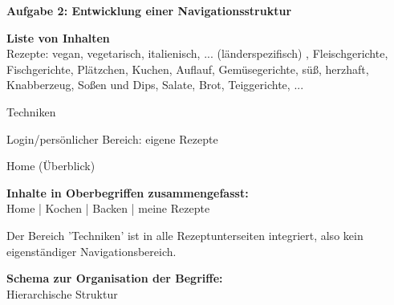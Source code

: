 \documentclass[parskip,10pt,abstracton]{scrartcl}
\renewcommand*{\maketitle}{%
	{\centering\LARGE\sffamily\bfseries Aufgabe 2: Entwicklung einer Navigationsstruktur \par}
	\vspace{3em}
}
\begin{document}
\maketitle


\textbf{Liste von Inhalten}\\
Rezepte: vegan, vegetarisch, italienisch, ... (länderspezifisch) , Fleischgerichte, Fischgerichte, Plätzchen, Kuchen, Auflauf, Gemüsegerichte, süß, herzhaft, Knabberzeug, Soßen und Dips, Salate, Brot, Teiggerichte, ...

Techniken

Login/persönlicher Bereich: eigene Rezepte

Home (Überblick)


\textbf{Inhalte in Oberbegriffen zusammengefasst:} \\
Home | Kochen | Backen | meine Rezepte

Der Bereich 'Techniken' ist in alle Rezeptunterseiten integriert, also kein eigenständiger Navigationsbereich.

\textbf{Schema zur Organisation der Begriffe:}\\
Hierarchische Struktur



\end{document}
